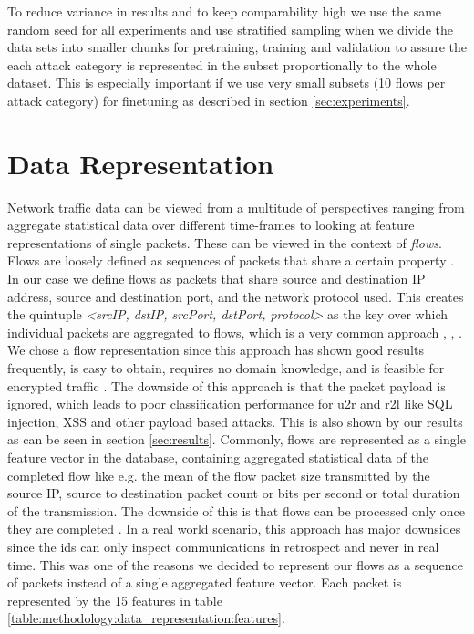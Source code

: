 To reduce variance in results and to keep comparability high we use the same random seed for all experiments and use stratified sampling when we divide the data sets into smaller chunks for pretraining, training and validation to assure the each attack category is represented in the subset proportionally to the whole dataset. This is especially important if we use very small subsets (10 flows per attack category) for finetuning as described in section \ref{sec:experiments}. 

\section{Data Representation}

Network traffic data can be viewed from a multitude of perspectives ranging from aggregate statistical data over different time-frames \cite{kitsune} to looking at feature representations of single packets. These can be viewed in the context of \textit{flows}.
Flows are loosely defined as sequences of packets that share a certain property \cite{adversarial_recurrent_ids}. In our case we define flows as packets that share source and destination IP address, source and destination port, and the network protocol used. This creates the quintuple \textit{<srcIP, dstIP, srcPort, dstPort, protocol>} as the key over which individual packets are aggregated to flows, which is a very common approach \cite{caia_vector}, \cite{unsw_nb15}, \cite{feature_vectors}. We chose a flow representation since this approach has shown good results frequently, is easy to obtain, requires no domain knowledge, and is feasible for encrypted traffic \cite{feature_vectors}. The downside of this approach is that the packet payload is ignored, which leads to poor classification performance for \gls{u2r} and \gls{r2l} \cite{nsl_kdd} like SQL injection, XSS and other payload based attacks. This is also shown by our results as can be seen in section \ref{sec:results}.
Commonly, flows are represented as a single feature vector in the database, containing aggregated statistical data of the completed flow like e.g. the mean of the flow packet size transmitted by the source IP, source to destination packet count or bits per second or total duration of the transmission. The downside of this is that flows can be processed only once they are completed \cite{adversarial_recurrent_ids}. In a real world scenario, this approach has major downsides since the \gls{ids} can only inspect communications in retrospect and never in real time. This was one of the reasons we decided to represent our flows as a sequence of packets instead of a single aggregated feature vector. Each packet is represented by the 15 features in table \ref{table:methodology:data_representation:features}.

